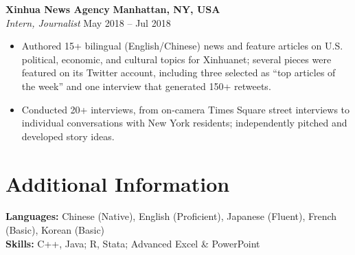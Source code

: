\documentclass[11pt]{article}
\begin{document}

\vspace{4pt}

\textbf{Xinhua News Agency} \hfill \textbf{Manhattan, NY, USA} \\
\textit{Intern, Journalist} \hfill May 2018 -- Jul 2018
\begin{itemize}
    \item Authored	15+	bilingual	(English/Chinese)	news	and	feature	articles	on	U.S.	political,	economic,	and	cultural	topics	for	
Xinhuanet;	several	pieces	were	featured	on	its	Twitter	account,	including	three	selected	as	“top	articles	of	the	week”	and	
one	interview	that	generated	150+	retweets.	
    \item Conducted	20+	interviews,	from	on-camera	Times	Square	street	interviews	to	individual	conversations	with	New	York	
residents;	independently	pitched	and	developed	story	ideas.	

\end{itemize}

\section*{Additional Information}

\textbf{Languages:} Chinese (Native), English (Proficient), Japanese (Fluent), French (Basic), Korean (Basic) \\
\textbf{Skills:} C++, Java; R, Stata; Advanced Excel \& PowerPoint
\end{document}
